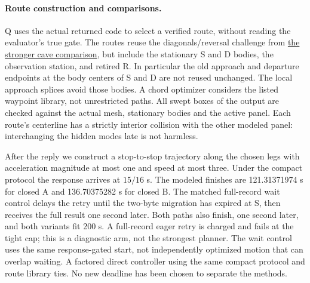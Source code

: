 \documentclass{article}
\begin{document}
\paragraph{Route construction and comparisons.}
Q uses the actual returned code to select a verified route,
without reading the evaluator's true gate. The routes reuse
the diagonals/reversal challenge from
\href{https://github.com/eternal-november/eos-research-programmes/pull/790}{the stronger cave comparison},
but include the stationary S and D bodies, the observation
station, and retired R. In particular the old approach and
departure endpoints at the body centers of S and D are not
reused unchanged. The local approach splices avoid those
bodies. A chord optimizer considers the listed waypoint
library, not unrestricted paths. All swept boxes of the
output are checked against the actual mesh, stationary bodies
and the active panel. Each route's centerline has a strictly
interior collision with the other modeled panel: interchanging
the hidden modes late is not harmless.

After the reply we construct a stop-to-stop trajectory along
the chosen legs with acceleration magnitude at most one and
speed at most three. Under the compact protocol the response
arrives at \(15/16\) s. The modeled finishes are
121.31371974 s for closed A and 136.70375282 s for closed B.
The matched full-record wait control delays the retry until
the two-byte migration has expired at S, then receives the
full result one second later. Both paths also finish, one
second later, and both variants fit 200 s. A full-record eager
retry is charged and fails at the tight cap; this is a
diagnostic arm, not the strongest planner. The wait control
uses the same response-gated start, not independently optimized
motion that can overlap waiting. A factored direct controller
using the same compact protocol and route library ties.
No new deadline has been chosen to separate the methods.
\end{document}
